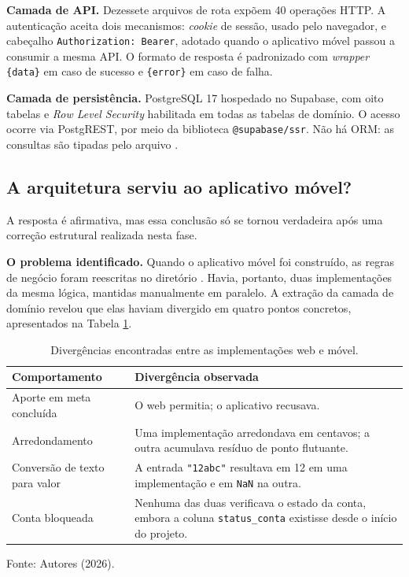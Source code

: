 \documentclass[12pt,a4paper]{article}
\begin{document}
\textbf{Camada de API.} Dezessete arquivos de rota expõem 40 operações HTTP. A autenticação aceita dois mecanismos: \textit{cookie} de sessão, usado pelo navegador, e cabeçalho \texttt{Authorization: Bearer}, adotado quando o aplicativo móvel passou a consumir a mesma API. O formato de resposta é padronizado com \textit{wrapper} \texttt{\{data\}} em caso de sucesso e \texttt{\{error\}} em caso de falha.

\textbf{Camada de persistência.} PostgreSQL 17 hospedado no Supabase, com oito tabelas e \textit{Row Level Security} habilitada em todas as tabelas de domínio. O acesso ocorre via PostgREST, por meio da biblioteca \texttt{@supabase/ssr}. Não há ORM: as consultas são tipadas pelo arquivo .

\subsection{A arquitetura serviu ao aplicativo móvel?}
\label{sec:serviu}

A resposta é afirmativa, mas essa conclusão só se tornou verdadeira após uma correção estrutural realizada nesta fase.

\textbf{O problema identificado.} Quando o aplicativo móvel foi construído, as regras de negócio foram reescritas no diretório . Havia, portanto, duas implementações da mesma lógica, mantidas manualmente em paralelo. A extração da camada de domínio revelou que elas haviam divergido em quatro pontos concretos, apresentados na Tabela \ref{tab:divergencias}.

\begin{table}[H]
\centering
\caption{Divergências encontradas entre as implementações web e móvel.}
\label{tab:divergencias}
\renewcommand{\arraystretch}{1.4}
\begin{tabularx}{\textwidth}{@{}>{\RaggedRight}p{3.6cm}>{\RaggedRight\arraybackslash}X@{}}
\toprule
\textbf{Comportamento} & \textbf{Divergência observada} \\
\midrule
Aporte em meta concluída & O web permitia; o aplicativo recusava. \\
Arredondamento & Uma implementação arredondava em centavos; a outra acumulava resíduo de ponto flutuante. \\
Conversão de texto para valor & A entrada \texttt{"12abc"} resultava em 12 em uma implementação e em \texttt{NaN} na outra. \\
Conta bloqueada & Nenhuma das duas verificava o estado da conta, embora a coluna \texttt{status\_conta} existisse desde o início do projeto. \\
\bottomrule
\end{tabularx}
\vspace{0.3cm}

\noindent\footnotesize Fonte: Autores (2026).
\end{table}
\end{document}
